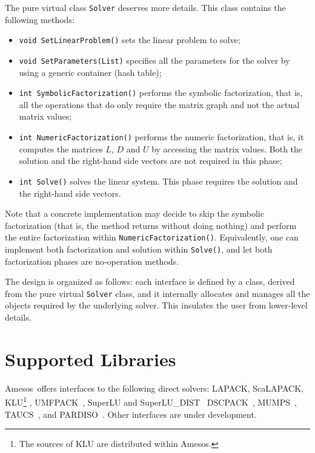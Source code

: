 \documentclass{llncs}
\newcommand{\amesos}{{\sc Amesos}}
\begin{document}
The pure virtual class {\tt Solver} deserves more details. This class contains
the following methods:
\begin{itemize}
\item
\verb!void SetLinearProblem()! sets the linear problem
to solve;
\item
\verb!void SetParameters(List)! specifies all the parameters for the solver by
using a generic container (hash table);
\item
\verb!int SymbolicFactorization()! performs the symbolic factorization, that
is, all the operations that do only require the matrix graph and not the
actual matrix values;
\item
\verb!int NumericFactorization()! performs the numeric factorization, that
is, it computes the matrices $L$, $D$ and $U$ by accessing the matrix values.
Both the solution and the right-hand side vectors are not required in this phase;
\item
\verb!int Solve()! solves the linear system. This phase requires the
solution and the right-hand side vectors.
\end{itemize}
Note that a concrete implementation may decide to skip the symbolic
factorization (that is, the method returns without doing nothing) and perform
the entire factorization within \verb!NumericFactorization()!. Equivalently,
one can implement both factorization and solution within \verb!Solve()!, and
let both factorization phases are no-operation methods.

The design is organized
as follows: each interface is defined by a class, derived from the
pure virtual {\tt Solver} class, and it internally allocates and manages all
the objects required by the underlying solver. This insulates the user from
lower-level details. 

\section{Supported Libraries}
\label{sec:supported}

\amesos\ offers interfaces to the following direct solvers: LAPACK, ScaLAPACK,
KLU\footnote{The sources of KLU are distributed within \amesos.}
\cite{davis05klu}, UMFPACK~\cite{umfpack-home-page}, SuperLU and
SuperLU\_DIST~\cite{superlu-manual} DSCPACK~\cite{dscpack-manual},
MUMPS~\cite{mumps-manual}, TAUCS~\cite{irony04parallel}, and
PARDISO~\cite{oskl:04-etna,sg:04-fgcs}. Other interfaces are under
development.
\end{document}
